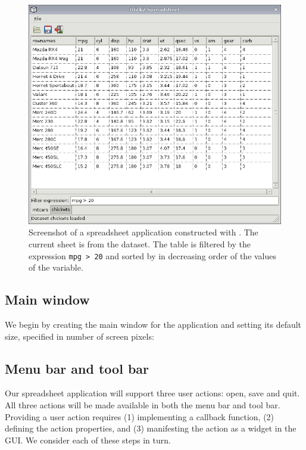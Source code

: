 \documentclass[article,shortnames]{jss}
\begin{document}
\begin{figure}[h!tbp]
\begin{center}
\includegraphics[width=6in]{spreadsheet.png}
\caption{\label{fig:spreadsheet}Screenshot of a spreadsheet
  application constructed with . The current sheet is from
the
   dataset. The table is filtered by the expression
  \texttt{mpg > 20} and sorted by in decreasing order of the values of
the  variable.}
\end{center}
\end{figure}

\subsection{Main window}

We begin by creating the main window for the application and setting
its default size, specified in number of screen pixels:

\subsection{Menu bar and tool bar}

Our spreadsheet application will support three user actions: open,
save and quit. All three actions will be made available in both the
menu bar and tool bar. Providing a user action requires (1)
implementing a callback function, (2) defining the action properties,
and (3) manifesting the action as a widget in the GUI. We consider
each of these steps in turn.
\end{document}
